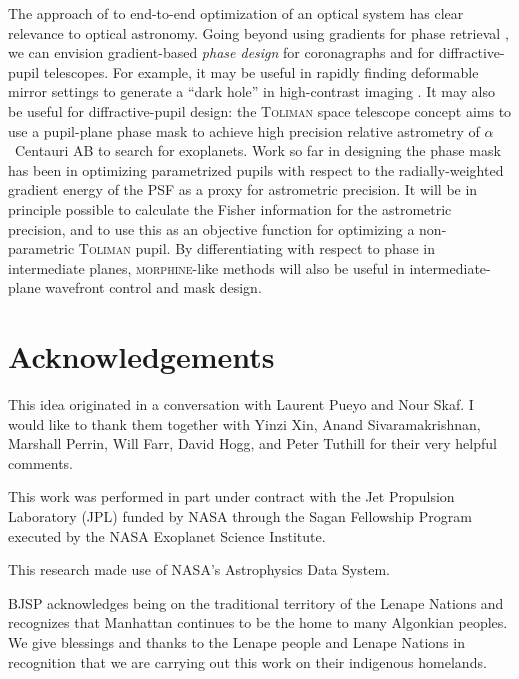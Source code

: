 \documentclass[modern]{aastex63}
\begin{document}
The approach of \citet{sitzmann2018} to end-to-end optimization of an optical system has clear relevance to optical astronomy. Going beyond using gradients for phase retrieval \citep{jurling14}, we can envision gradient-based \textit{phase design} for coronagraphs and for diffractive-pupil telescopes. For example, it may be useful in rapidly finding deformable mirror settings to generate a ``dark hole'' in high-contrast imaging \citep{malbet95}. It may also be useful for diffractive-pupil design: the \textsc{Toliman} space telescope concept \citep{tuthill18,bendek18} aims to use a pupil-plane phase mask to achieve high precision relative astrometry of $\alpha$~Centauri AB to search for exoplanets. Work so far in designing the phase mask has been in optimizing parametrized pupils with respect to the radially-weighted gradient energy of the PSF as a proxy for astrometric precision. It will be in principle possible to calculate the Fisher information for the astrometric precision, and to use this as an objective function for optimizing a non-parametric \textsc{Toliman} pupil. By differentiating with respect to phase in intermediate planes, \textsc{morphine}-like methods will also be useful in intermediate-plane wavefront control and mask design.

\section*{Acknowledgements} %

This idea originated in a conversation with Laurent Pueyo and Nour Skaf. I would like to thank them together with Yinzi Xin, Anand Sivaramakrishnan, Marshall Perrin, Will Farr, David Hogg, and Peter Tuthill for their very helpful comments.

This work was performed in part under contract with the Jet Propulsion Laboratory (JPL) funded by NASA through the Sagan Fellowship Program executed by the NASA Exoplanet Science Institute. 

This research made use of NASA's Astrophysics Data System.

BJSP acknowledges being on the traditional territory of the Lenape Nations and recognizes that Manhattan continues to be the home to many Algonkian peoples. We give blessings and thanks to the Lenape people and Lenape Nations in recognition that we are carrying out this work on their indigenous homelands.
%
\end{document}
